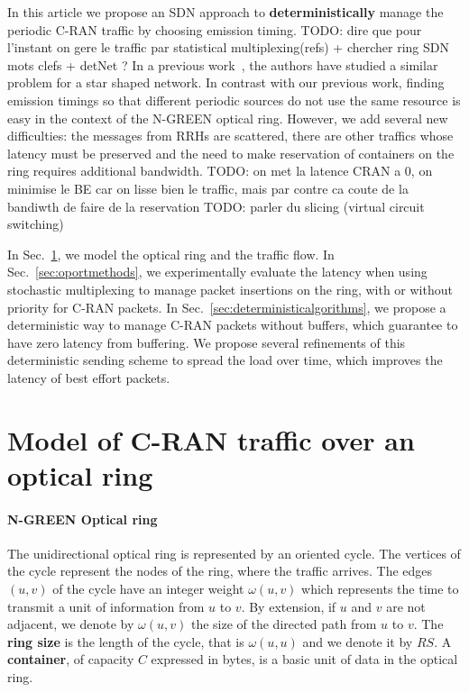 \documentclass[10pt, conference, letterpaper]{IEEEtran}
\newcommand{\todo}[1]{{\color{red} TODO: {#1}}}
\begin{document}
In this article we propose an SDN approach to {\bf deterministically} manage the periodic C-RAN traffic by choosing emission timing.\todo{dire que pour l'instant on gere le traffic par statistical multiplexing(refs) + chercher ring SDN mots clefs + detNet ?} In a previous work~\cite{dominique2018deterministic}, the authors have studied a similar problem for a star shaped network. In contrast with our previous work, finding emission timings so that different periodic sources do not use the same resource is easy in the context of the N-GREEN optical ring. However, we add several new difficulties: the messages from RRHs are scattered, there are other traffics whose latency must be preserved and the need to make reservation of containers on the ring requires additional bandwidth.
\todo{on met la latence CRAN a 0, on minimise le BE car on lisse bien le traffic, mais par contre ca coute de la bandiwth de faire de la reservation}
\todo{parler du slicing (virtual circuit switching) }

In Sec.~\ref{sec:model}, we model the optical ring and the traffic flow. In Sec.~\ref{sec:oportmethods}, we experimentally evaluate the latency when using stochastic multiplexing to manage packet insertions on the ring, with or without priority for C-RAN packets. In Sec.~\ref{sec:deterministicalgorithms}, we propose a deterministic way to manage C-RAN packets without buffers, which guarantee to have zero latency from buffering. We propose several refinements of this deterministic sending scheme to spread the load over time, which improves the latency of best effort packets.

\section{Model of C-RAN traffic over an optical ring}
\label{sec:model}
    
  \paragraph{N-GREEN Optical ring}
   
  The unidirectional optical ring is represented by an oriented cycle. The vertices of the cycle represent the nodes of the ring, where the traffic arrives. The edges $(u,v)$ of the cycle have an integer weight $\omega(u,v)$ which represents the time to transmit a unit of information from $u$ to $v$. By extension, if $u$ and $v$ are not adjacent, we denote by $\omega(u,v)$ the size of the directed path from $u$ to $v$.  The \textbf{ring size} is the length of the cycle, that is $\omega(u,u)$ and we denote it by $RS$. A {\bf container}, of capacity $C$  expressed in bytes, is a basic unit of data in the optical ring. 
  
\end{document}
